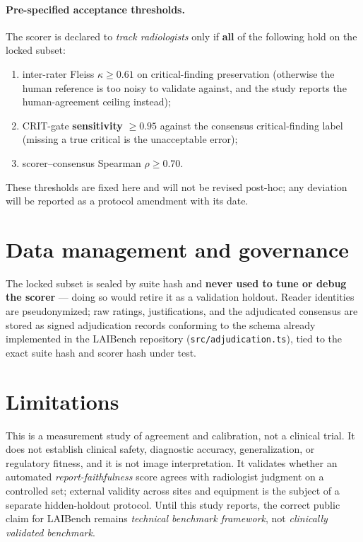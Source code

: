 \documentclass[11pt]{article}
\begin{document}
\paragraph{Pre-specified acceptance thresholds.} The scorer is declared to \emph{track radiologists} only if \textbf{all} of the following hold on the locked subset:
\begin{enumerate}[leftmargin=*,nosep]
\item inter-rater Fleiss $\kappa \geq 0.61$ on critical-finding preservation (otherwise the human reference is too noisy to validate against, and the study reports the human-agreement ceiling instead);
\item CRIT-gate \textbf{sensitivity} $\geq 0.95$ against the consensus critical-finding label (missing a true critical is the unacceptable error);
\item scorer--consensus Spearman $\rho \geq 0.70$.
\end{enumerate}
These thresholds are fixed here and will not be revised post-hoc; any deviation will be reported as a protocol amendment with its date.

\section{Data management and governance}
The locked subset is sealed by suite hash and \textbf{never used to tune or debug the scorer} --- doing so would retire it as a validation holdout. Reader identities are pseudonymized; raw ratings, justifications, and the adjudicated consensus are stored as signed adjudication records conforming to the schema already implemented in the LAIBench repository (\texttt{src/adjudication.ts}), tied to the exact suite hash and scorer hash under test.

\section{Limitations}
This is a measurement study of agreement and calibration, not a clinical trial. It does not establish clinical safety, diagnostic accuracy, generalization, or regulatory fitness, and it is not image interpretation. It validates whether an automated \emph{report-faithfulness} score agrees with radiologist judgment on a controlled set; external validity across sites and equipment is the subject of a separate hidden-holdout protocol. Until this study reports, the correct public claim for LAIBench remains \emph{technical benchmark framework}, not \emph{clinically validated benchmark}.
\end{document}
